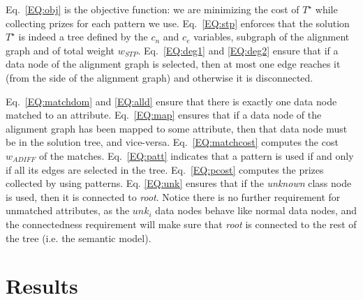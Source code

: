 \documentclass[letterpaper]{article} %
\newcommand{\ignore}[1]{}
\newcommand{\forijcai}[1]{}
\begin{document}
Eq.~\ref{EQ:obj} is the objective function: we are minimizing the cost 
of $T^\star$ while collecting prizes for each pattern we use. 
Eq.~\ref{EQ:stp} enforces that the solution 
$T^\star$ is indeed a tree defined by the $c_n$ and $c_e$ variables,
subgraph of the alignment graph 
and of total weight $w_{STP}$. 
Eq.~\ref{EQ:deg1} and \ref{EQ:deg2} ensure 
that if a data node of the alignment graph is selected, then at most one edge 
reaches it (from the side of the alignment graph) and otherwise it is 
disconnected. 
\ignore{Eq. \ref{EQ:matchdom} ensures that the domain of each 
variable in 
the array $match$ corresponds to a subset of data nodes of the alignment graph 
for which there is an edge connecting to the attribute at hand. 
Eq.~\ref{EQ:alld} ensure that each attribute is mapped to exactly one data node of 
the alignment graph.}
Eq.~\ref{EQ:matchdom} and \ref{EQ:alld} ensure that 
there is exactly one data node matched to an attribute. 
Eq.~\ref{EQ:map} ensures that 
if a data node of the alignment graph has been mapped to some attribute, then 
that data node must be in the solution tree, and vice-versa. 
Eq.~\ref{EQ:matchcost} computes the cost $w_{ADIFF}$ of the matches.
Eq.~\ref{EQ:patt} indicates that a pattern is used if and only if all its edges are selected in the tree. 
Eq.~\ref{EQ:pcost} computes the prizes collected by using patterns.
Eq. \ref{EQ:unk} ensures that if the \emph{unknown} class node is used, then it 
is connected to \emph{root}.
Notice there is no further requirement for unmatched attributes, as the 
$unk_i$ data nodes behave like normal data nodes, and the connectedness 
requirement will make sure that \emph{root} is connected to the rest of the 
tree (i.e. the semantic model).

\forijcai{
Note how this CP model is easy to adapt to more classic settings where no 
patterns are used (by dropping Eqs. \ref{EQ:patt} and \ref{EQ:pcost}), or 
without \emph{unknown} nodes (by dropping Eq. \ref{EQ:unk}).

We choose a search strategy that will first try to match attributes using the cheapest edges in $\mathcal{M}_\mathcal{O}^{s^\star}$. Then, it will try to use the cheapest unfixed edge $e\in\mathcal{E_O}$ that fills a pattern $p$ (i.e. $\forall e_p\in p, e_p \neq e, c_{e_p}$) such that $w_\mathcal{P}(p) > w_\mathcal{O}(e)$ or simply the cheapest edge if none fill a pattern.
}

\section{Results \label{SEC:Res}}
\end{document}
